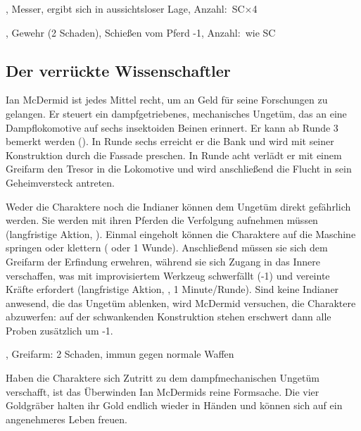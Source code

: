 {		, Messer, ergibt sich in aussichtsloser Lage, Anzahl:~SC×4

		, Gewehr (2 Schaden), Schießen vom Pferd -1, Anzahl:~wie SC

		\subsection{Der verrückte Wissenschaftler}

		Ian McDermid ist jedes Mittel recht, um an Geld für seine Forschungen zu gelangen. Er steuert ein dampfgetriebenes, mechanisches Ungetüm, das an eine Dampflokomotive auf sechs insektoiden Beinen erinnert. Er kann ab Runde 3 bemerkt werden (). In Runde sechs erreicht er die Bank und wird mit seiner Konstruktion durch die Fassade preschen. In Runde acht verlädt er mit einem Greifarm den Tresor in die Lokomotive und wird anschließend die Flucht in sein Geheimversteck antreten.

		Weder die Charaktere noch die Indianer können dem Ungetüm direkt gefährlich werden. Sie werden mit ihren Pferden die Verfolgung aufnehmen müssen (langfristige Aktion, ). Einmal eingeholt können die Charaktere auf die Maschine springen oder klettern ( oder 1 Wunde). Anschließend müssen sie sich dem Greifarm der Erfindung erwehren, während sie sich Zugang in das Innere verschaffen, was mit improvisiertem Werkzeug schwerfällt (-1) und vereinte Kräfte erfordert (langfristige Aktion, , 1 Minute/Runde). Sind keine Indianer anwesend, die das Ungetüm ablenken, wird McDermid versuchen, die Charaktere abzuwerfen: auf der schwankenden Konstruktion stehen erschwert dann alle Proben zusätzlich um -1.

		, Greifarm: 2 Schaden, immun gegen normale Waffen



		\noindent
		Haben die Charaktere sich Zutritt zu dem dampfmechanischen Ungetüm verschafft, ist das Überwinden Ian McDermids reine Formsache. Die vier Goldgräber halten ihr Gold endlich wieder in Händen und können sich auf ein angenehmeres Leben freuen.
}
